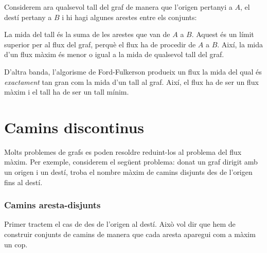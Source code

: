 Considerem ara qualsevol tall del graf de manera que l'origen pertanyi
a $A$, el destí pertany a $B$ i hi hagi algunes arestes entre els
conjunts:


\begin{center}
\end{center}


La mida del tall és la suma de les arestes que van de $A$ a
$B$. Aquest és un límit superior per al flux del graf, perquè el flux
ha de procedir de $A$ a $B$. Així, la mida d'un flux màxim és menor o
igual a la mida de qualsevol tall del graf.

D'altra banda, l'algorisme de Ford-Fulkerson produeix un flux la mida
del qual és \emph{exactament} tan gran com la mida d'un tall al
graf. Així, el flux ha de ser un flux màxim i el tall ha de ser un
tall mínim.

\section{Camins discontinus}

Molts problemes de grafs es poden resoldre reduint-los al problema del
flux màxim. Per exemple, considerem el següent problema: donat un graf
dirigit amb un origen i un destí, troba el nombre màxim de camins
disjunts des de l'origen fins al destí.

\subsubsection{Camins aresta-disjunts}

Primer tractem el cas de  des de l'origen
al destí. Això vol dir que hem de construir conjunts de camins de
manera que cada aresta aparegui com a màxim un cop.

